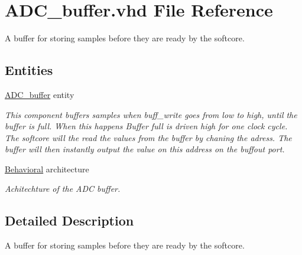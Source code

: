 \hypertarget{ADC__buffer_8vhd}{\section{A\-D\-C\-\_\-buffer.\-vhd File Reference}
\label{ADC__buffer_8vhd}
}


A buffer for storing samples before they are ready by the softcore.  


\subsection*{Entities}
\begin{DoxyCompactItemize}
\item 
\hyperlink{classADC__buffer}{A\-D\-C\-\_\-buffer} entity
\begin{DoxyCompactList}\small\item\em This component buffers samples when buff\-\_\-write goes from low to high, until the buffer is full. When this happens Buffer full is driven high for one clock cycle. The softcore will the read the values from the buffer by chaning the adress. The buffer will then instantly output the value on this address on the buffout port. \end{DoxyCompactList}\item 
\hyperlink{classADC__buffer_1_1Behavioral}{Behavioral} architecture
\begin{DoxyCompactList}\small\item\em Achitechture of the A\-D\-C buffer. \end{DoxyCompactList}\end{DoxyCompactItemize}


\subsection{Detailed Description}
A buffer for storing samples before they are ready by the softcore. 